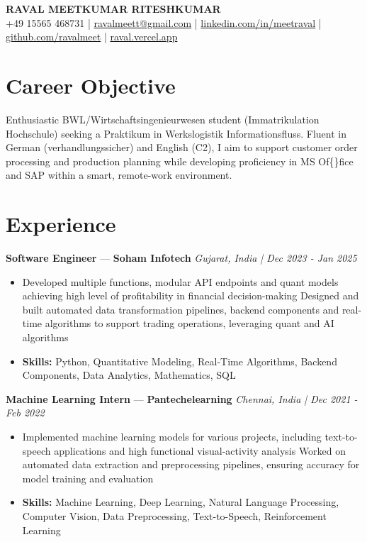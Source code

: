\documentclass[a4paper,10pt]{article}
\begin{document}
\begin{center}
  {\Large\bfseries RAVAL MEETKUMAR RITESHKUMAR}\\[2pt]
  {\small +49 15565 468731 \;|\; \href{mailto:ravalmeett@gmail.com}{ravalmeett@gmail.com} \;|\; \href{https://www.linkedin.com/in/meetraval/}{linkedin.com/in/meetraval} \;|\; \href{https://github.com/ravalmeet}{github.com/ravalmeet} \;|\; \href{https://raval.vercel.app/}{raval.vercel.app}}
\end{center}
\vspace{-3pt}

\section*{Career Objective}
Enthusiastic BWL/Wirtschaftsingenieurwesen student (Immatrikulation Hochschule) seeking a Praktikum in Werkslogistik Informationsfluss. Fluent in German (verhandlungssicher) and English (C2), I aim to support customer order processing and production planning while developing proficiency in MS Of\{\}fice and SAP within a smart, remote-work environment.\par

\section*{Experience}
\textbf{Software Engineer} — \textbf{Soham Infotech} \hfill \textit{Gujarat, India \;|\; Dec 2023 - Jan 2025}\par
\vspace{1pt}
\begin{itemize}
  \item Developed multiple functions, modular API endpoints and quant models achieving high level of profitability in financial decision-making Designed and built automated data transformation pipelines, backend components and real-time algorithms to support trading operations, leveraging quant and AI algorithms
  \item \textbf{Skills:} Python, Quantitative Modeling, Real-Time Algorithms, Backend Components, Data Analytics, Mathematics, SQL
\end{itemize}
\vspace{3pt}
\textbf{Machine Learning Intern} — \textbf{Pantechelearning} \hfill \textit{Chennai, India \;|\; Dec 2021 - Feb 2022}\par
\vspace{1pt}
\begin{itemize}
  \item Implemented machine learning models for various projects, including text-to-speech applications and high functional visual-activity analysis Worked on automated data extraction and preprocessing pipelines, ensuring accuracy for model training and evaluation
  \item \textbf{Skills:} Machine Learning, Deep Learning, Natural Language Processing, Computer Vision, Data Preprocessing, Text-to-Speech, Reinforcement Learning
\end{itemize}
\end{document}
